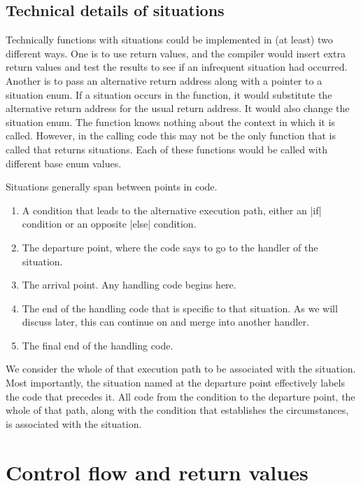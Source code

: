 \documentclass[10pt]{amsart}
\begin{document}
\subsection{Technical details of situations}

Technically functions with situations could be implemented in (at
least) two different ways.  One is to use return values, and the
compiler would insert extra return values and test the results to see
if an infrequent situation had occurred.  Another is to pass an
alternative return address along with a pointer to a situation enum.
If a situation occurs in the function, it would substitute the
alternative return address for the usual return address.  It would
also change the situation enum.  The function knows nothing about the
context in which it is called.  However, in the calling code this may
not be the only function that is called that returns situations.  Each
of these functions would be called with different base enum values.

Situations generally span between points in code.
\begin{enumerate}
\item A condition that leads to the alternative execution path, either
  an |if| condition or an opposite |else| condition.
\item The departure point, where the code says to go to the handler of
  the situation.
\item The arrival point.  Any handling code begins here.
\item The end of the handling code that is specific to that situation.
  As we will discuss later, this can continue on and merge into
  another handler.
\item The final end of the handling code.
\end{enumerate}
We consider the whole of that execution path to be associated with the
situation.  Most importantly, the situation named at the departure
point effectively labels the code that precedes it.  All code from the
condition to the departure point, the whole of that path, along with
the condition that establishes the circumstances, is associated with
the situation.

\section{Control flow and return values}
\end{document}
